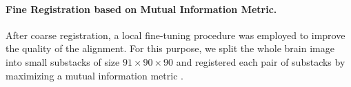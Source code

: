 \documentclass[smallextended]{svjour3}       %
\begin{document}
\paragraph{Fine Registration based on Mutual Information Metric.}
After coarse registration, a local fine-tuning procedure was employed to
improve the quality of the alignment. For this purpose, we split the
whole brain image into small substacks of size $91\times 90\times 90$ and registered
each pair of substacks by maximizing a mutual information metric
\cite{viola_alignment_1997}.
%
%
%
\end{document}
